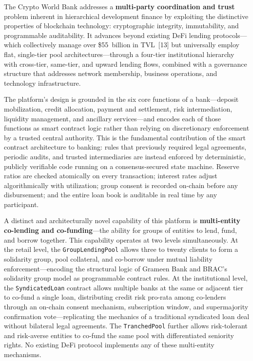 \documentclass[12pt,a4paper]{report}
\begin{document}
The Crypto World Bank addresses a \textbf{multi-party coordination and trust} problem inherent in hierarchical development finance by exploiting the distinctive properties of blockchain technology: cryptographic integrity, immutability, and programmable auditability. It advances beyond existing DeFi lending protocols---which collectively manage over \$55~billion in TVL~[13] but universally employ flat, single-tier pool architectures---through a four-tier institutional hierarchy with cross-tier, same-tier, and upward lending flows, combined with a governance structure that addresses network membership, business operations, and technology infrastructure.

The platform's design is grounded in the six core functions of a bank---deposit mobilization, credit allocation, payment and settlement, risk intermediation, liquidity management, and ancillary services---and encodes each of those functions as smart contract logic rather than relying on discretionary enforcement by a trusted central authority. This is the fundamental contribution of the smart contract architecture to banking: rules that previously required legal agreements, periodic audits, and trusted intermediaries are instead enforced by deterministic, publicly verifiable code running on a consensus-secured state machine. Reserve ratios are checked atomically on every transaction; interest rates adjust algorithmically with utilization; group consent is recorded on-chain before any disbursement; and the entire loan book is auditable in real time by any participant.

A distinct and architecturally novel capability of this platform is \textbf{multi-entity co-lending and co-funding}---the ability for groups of entities to lend, fund, and borrow together. This capability operates at two levels simultaneously. At the retail level, the \texttt{GroupLendingPool} allows three to twenty clients to form a solidarity group, pool collateral, and co-borrow under mutual liability enforcement---encoding the structural logic of Grameen Bank and BRAC's solidarity group model as programmable contract rules. At the institutional level, the \texttt{SyndicatedLoan} contract allows multiple banks at the same or adjacent tier to co-fund a single loan, distributing credit risk pro-rata among co-lenders through an on-chain consent mechanism, subscription window, and supermajority confirmation vote---replicating the mechanics of a traditional syndicated loan deal without bilateral legal agreements. The \texttt{TranchedPool} further allows risk-tolerant and risk-averse entities to co-fund the same pool with differentiated seniority rights. No existing DeFi protocol implements any of these multi-entity mechanisms.
\end{document}
